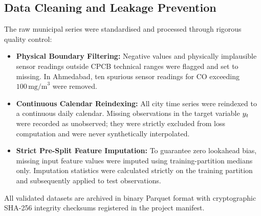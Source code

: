 \subsection{Data Cleaning and Leakage Prevention}
The raw municipal series were standardised and processed through rigorous quality control:
\begin{itemize}
  \item \textbf{Physical Boundary Filtering:} Negative values and physically implausible sensor readings outside CPCB technical ranges were flagged and set to missing. In Ahmedabad, ten spurious sensor readings for CO exceeding $100\,\text{mg/m}^3$ were removed.
  \item \textbf{Continuous Calendar Reindexing:} All city time series were reindexed to a continuous daily calendar. Missing observations in the target variable $y_t$ were recorded as unobserved; they were strictly excluded from loss computation and were never synthetically interpolated.
  \item \textbf{Strict Pre-Split Feature Imputation:} To guarantee zero lookahead bias, missing input feature values were imputed using training-partition medians only. Imputation statistics were calculated strictly on the training partition and subsequently applied to test observations.
\end{itemize}
All validated datasets are archived in binary Parquet format with cryptographic SHA-256 integrity checksums registered in the project manifest.

